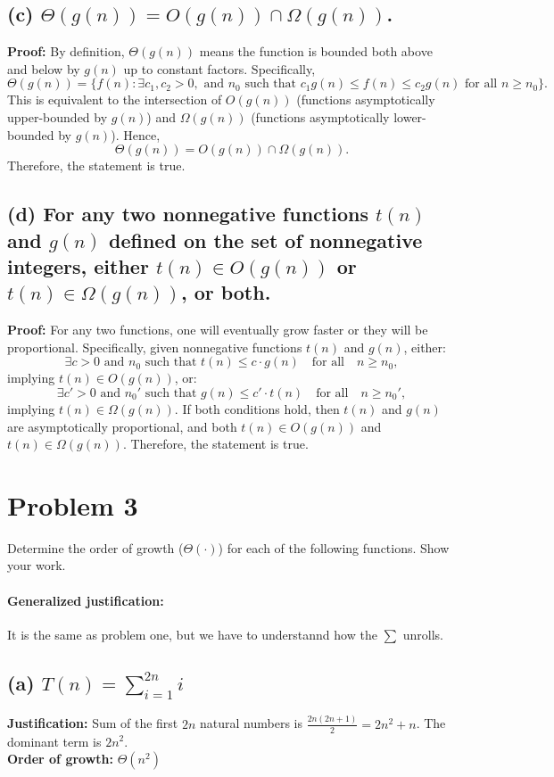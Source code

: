 \documentclass{article}
\begin{document}
\subsection*{(c) \(\Theta(g(n)) = O(g(n)) \cap \Omega(g(n))\).}
\textbf{Proof:} 
By definition, \( \Theta(g(n)) \) means the function is bounded both above and below by \( g(n) \) up to constant factors. Specifically,
\[
\Theta(g(n)) = \{ f(n) : \exists c_1, c_2 > 0, \text{ and } n_0 \text{ such that } c_1 g(n) \leq f(n) \leq c_2 g(n) \text{ for all } n \geq n_0 \}.
\]
This is equivalent to the intersection of \( O(g(n)) \) (functions asymptotically upper-bounded by \( g(n) \)) and \( \Omega(g(n)) \) (functions asymptotically lower-bounded by \( g(n) \)). Hence,
\[
\Theta(g(n)) = O(g(n)) \cap \Omega(g(n)).
\]
Therefore, the statement is true.

\subsection*{(d) For any two nonnegative functions \( t(n) \) and \( g(n) \) defined on the set of nonnegative integers, either \( t(n) \in O(g(n)) \) or \( t(n) \in \Omega(g(n)) \), or both.}
\textbf{Proof:} 
For any two functions, one will eventually grow faster or they will be proportional. Specifically, given nonnegative functions \( t(n) \) and \( g(n) \), either:
\[
\exists c > 0 \text{ and } n_0 \text{ such that } t(n) \leq c \cdot g(n) \quad \text{for all} \quad n \geq n_0,
\]
implying \( t(n) \in O(g(n)) \), or:
\[
\exists c' > 0 \text{ and } n_0' \text{ such that } g(n) \leq c' \cdot t(n) \quad \text{for all} \quad n \geq n_0',
\]
implying \( t(n) \in \Omega(g(n)) \). If both conditions hold, then \( t(n) \) and \( g(n) \) are asymptotically proportional, and both \( t(n) \in O(g(n)) \) and \( t(n) \in \Omega(g(n)) \). Therefore, the statement is true.

\section*{Problem 3}
Determine the order of growth (\(\Theta(\cdot)\)) for each of the following functions. Show your work.

\paragraph{Generalized justification:} It is the same as problem one, but we have to understannd how the \(\sum\) unrolls.
 
\subsection*{(a) \( T(n) = \sum_{i=1}^{2n} i \)}
\textbf{Justification:} Sum of the first \(2n\) natural numbers is \( \frac{2n(2n+1)}{2} = 2n^2 + n \). The dominant term is \( 2n^2 \).
\\ \textbf{Order of growth:} \( \Theta(n^2) \)
\end{document}
